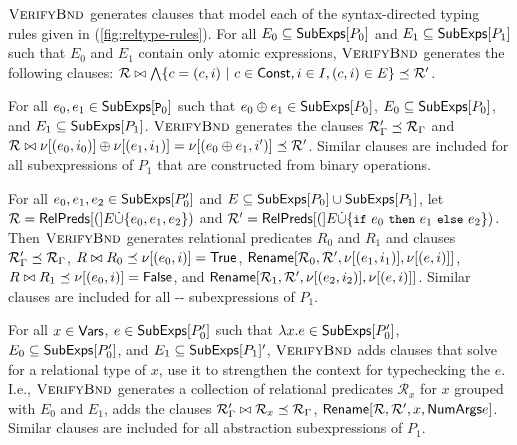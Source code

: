 $\textsc{VerifyBnd}$ generates clauses that model each of the syntax-directed
typing rules given in (\autoref{fig:reltype-rules}).
%
For all $E_0 \subseteq \mathsf{SubExps}[  P_0  ]$ and $E_1 \subseteq \mathsf{SubExps}[ 
  P_1  ]$ such that $E_0$ and $E_1$ contain only atomic expressions,
$\textsc{VerifyBnd}$ generates the following clauses:
%
$\mathcal{R} \joinctr %
\bigland \setformer{ c = (c, i) }{ c \in \const, i \in I, (c, i) \in E
} \subtype \mathcal{R}'$.

For all $e_0, e_1 \in \subexps{ \cc{P}_0 }$ such that $e_0 \oplus e_1
\in \mathsf{SubExps}[  P_0  ]$, %
$E_0 \subseteq \mathsf{SubExps}[  P_0  ]$, and %
$E_1 \subseteq \mathsf{SubExps}[  P_1  ]$.
%
$\textsc{VerifyBnd}$ generates the clauses
$\mathcal{R}'_{\Gamma} \preceq \mathcal{R}_{\Gamma}$ and 
$\mathcal{R} \bowtie \nu[  (e_0, i_0)  ] \oplus \nu[  (e_1, i_1)
 ] = \nu[  (e_0 \oplus e_1, i')  ] \preceq \mathcal{R}'$.
%
Similar clauses are included for all subexpressions of $P_1$ that are
constructed from binary operations.

For all $e_0, e_1, e_2 \in \mathsf{SubExps}[  P_0'  ]$ and $E \subseteq
\mathsf{SubExps}[  P_0  ] \cup \mathsf{SubExps}[  P_1  ]$, let $\mathcal{R} =
\mathsf{RelPreds}[ ( ]E \dot{\cup} \{  e_0, e_1, e_2  \})$ and $\mathcal{R}' =
\symrelpreds(E \disjunion \elts{ \ite{e_0}{e_1}{e_2} })$.
%
Then $\textsc{VerifyBnd}$ generates relational predicates $R_0$ and $R_1$ and
clauses
$\mathcal{R}'_{\Gamma} \preceq \mathcal{R}_{\Gamma}$,
$ R  \bowtie  R_0  \preceq  \nu[  (e_0, i)  ] = \mathsf{True}$,
%
$\mathsf{Rename}[  \mathcal{R}_0 ,  \mathcal{ R }' ,  \nu[  (e_1, i_1)  ]
,  \nu[ (e, i) ]  ]$,
%
$ R  \bowtie  R_1  \preceq  \nu[  (e_0, i)  ] = \mathsf{False}$, and
%
$\mathsf{Rename}[  \mathcal{R}_1 ,  \mathcal{ R }' ,  \nu[  (e_2, i_2)  ]
,  \nu[  (e, i)  ]  ]$.
%
Similar clauses are included for all --
subexpressions of $P_1$.

For all $x \in \mathsf{Vars}$, %
$e \in \mathsf{SubExps}[  P_0'  ]$ such that $\lambda x. e \in
\mathsf{SubExps}[ P_0' ]$, %
$E_0 \subseteq \mathsf{SubExps}[ P_0' ]$, and %
$E_1 \subseteq \mathsf{SubExps}[ P_1 ]'$, $\textsc{VerifyBnd}$ adds clauses that solve
for a relational type of $x$, use it to strengthen the context for
typechecking the $e$.
%
I.e., $\textsc{VerifyBnd}$ generates a collection of relational predicates
$\mathcal{R}_x$ for $x$ grouped with $E_0$ and $E_1$, %
adds the clauses
$\mathcal{R}'_{\Gamma} \bowtie \mathcal{R}_x \preceq
\mathcal{R}_{\Gamma}$, %
$\mathsf{Rename}[  \mathcal{R} ,  \mathcal{R}' ,  x ,  \mathsf{NumArgs}{e}  ]$.
%
Similar clauses are included for all abstraction subexpressions of
$P_1$.

